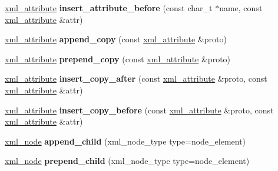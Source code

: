 \begin{DoxyCompactItemize}
\item 
\hypertarget{classpugi_1_1xml__node_a742898bc2342d943a4c49916ac3a64b8}{\hyperlink{classpugi_1_1xml__attribute}{xml\+\_\+attribute} {\bfseries insert\+\_\+attribute\+\_\+before} (const char\+\_\+t $\ast$name, const \hyperlink{classpugi_1_1xml__attribute}{xml\+\_\+attribute} \&attr)}\label{classpugi_1_1xml__node_a742898bc2342d943a4c49916ac3a64b8}

\item 
\hypertarget{classpugi_1_1xml__node_a4c151e6665c6bfa614fe80d177fd5396}{\hyperlink{classpugi_1_1xml__attribute}{xml\+\_\+attribute} {\bfseries append\+\_\+copy} (const \hyperlink{classpugi_1_1xml__attribute}{xml\+\_\+attribute} \&proto)}\label{classpugi_1_1xml__node_a4c151e6665c6bfa614fe80d177fd5396}

\item 
\hypertarget{classpugi_1_1xml__node_abd0f80e4d5bc938a27b50d37a0c7865b}{\hyperlink{classpugi_1_1xml__attribute}{xml\+\_\+attribute} {\bfseries prepend\+\_\+copy} (const \hyperlink{classpugi_1_1xml__attribute}{xml\+\_\+attribute} \&proto)}\label{classpugi_1_1xml__node_abd0f80e4d5bc938a27b50d37a0c7865b}

\item 
\hypertarget{classpugi_1_1xml__node_ab5fd2ccada30141544b12c6ef554d8f4}{\hyperlink{classpugi_1_1xml__attribute}{xml\+\_\+attribute} {\bfseries insert\+\_\+copy\+\_\+after} (const \hyperlink{classpugi_1_1xml__attribute}{xml\+\_\+attribute} \&proto, const \hyperlink{classpugi_1_1xml__attribute}{xml\+\_\+attribute} \&attr)}\label{classpugi_1_1xml__node_ab5fd2ccada30141544b12c6ef554d8f4}

\item 
\hypertarget{classpugi_1_1xml__node_ac81f8aded4b53a9b8c98d131986cb535}{\hyperlink{classpugi_1_1xml__attribute}{xml\+\_\+attribute} {\bfseries insert\+\_\+copy\+\_\+before} (const \hyperlink{classpugi_1_1xml__attribute}{xml\+\_\+attribute} \&proto, const \hyperlink{classpugi_1_1xml__attribute}{xml\+\_\+attribute} \&attr)}\label{classpugi_1_1xml__node_ac81f8aded4b53a9b8c98d131986cb535}

\item 
\hypertarget{classpugi_1_1xml__node_a190f4851bb4bc4bb61c89fffb663a9af}{\hyperlink{classpugi_1_1xml__node}{xml\+\_\+node} {\bfseries append\+\_\+child} (xml\+\_\+node\+\_\+type type=node\+\_\+element)}\label{classpugi_1_1xml__node_a190f4851bb4bc4bb61c89fffb663a9af}

\item 
\hypertarget{classpugi_1_1xml__node_a9e0a6dddfe1fefc74bb2b7689376989c}{\hyperlink{classpugi_1_1xml__node}{xml\+\_\+node} {\bfseries prepend\+\_\+child} (xml\+\_\+node\+\_\+type type=node\+\_\+element)}\label{classpugi_1_1xml__node_a9e0a6dddfe1fefc74bb2b7689376989c}


\end{DoxyCompactItemize}
